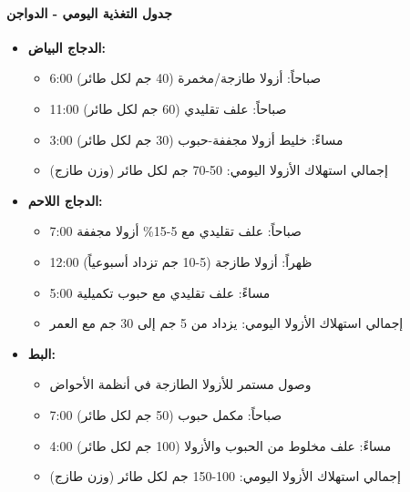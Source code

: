 \paragraph{جدول التغذية اليومي - الدواجن}
\begin{itemize}
    \item \textbf{الدجاج البياض:}
    \begin{itemize}
        \item 6:00 صباحاً: أزولا طازجة/مخمرة (40 جم لكل طائر)
        \item 11:00 صباحاً: علف تقليدي (60 جم لكل طائر)
        \item 3:00 مساءً: خليط أزولا مجففة-حبوب (30 جم لكل طائر)
        \item إجمالي استهلاك الأزولا اليومي: 50-70 جم لكل طائر (وزن طازج)
    \end{itemize}
    \item \textbf{الدجاج اللاحم:}
    \begin{itemize}
        \item 7:00 صباحاً: علف تقليدي مع 5-15\% أزولا مجففة
        \item 12:00 ظهراً: أزولا طازجة (5-10 جم تزداد أسبوعياً)
        \item 5:00 مساءً: علف تقليدي مع حبوب تكميلية
        \item إجمالي استهلاك الأزولا اليومي: يزداد من 5 جم إلى 30 جم مع العمر
    \end{itemize}
    \item \textbf{البط:}
    \begin{itemize}
        \item وصول مستمر للأزولا الطازجة في أنظمة الأحواض
        \item 7:00 صباحاً: مكمل حبوب (50 جم لكل طائر)
        \item 4:00 مساءً: علف مخلوط من الحبوب والأزولا (100 جم لكل طائر)
        \item إجمالي استهلاك الأزولا اليومي: 100-150 جم لكل طائر (وزن طازج)
    \end{itemize}
\end{itemize}

